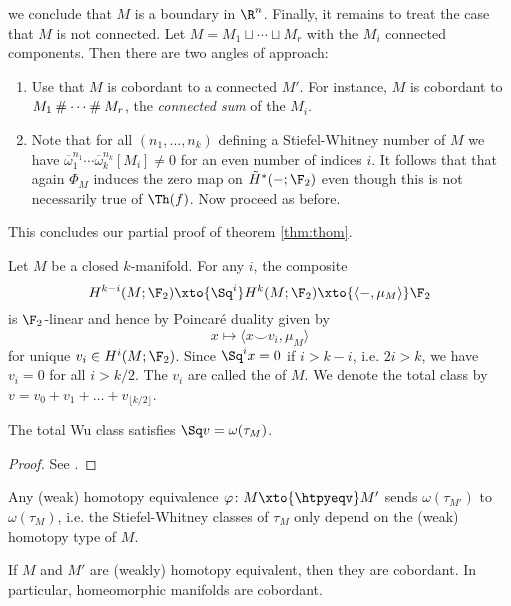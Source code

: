 we conclude that $M$ is a boundary in $\R^n$.
Finally, it remains to treat the case that $M$ is not connected.
Let $M = M_1 \sqcup \cdots \sqcup M_r$ with the $M_i$ connected components.
Then there are two angles of approach:
\begin{enumerate}
	\item Use that $M$ is cobordant to a connected $M'$.
		For instance, $M$ is cobordant to $M_1 \mathbin{\#} \cdots \mathbin{\#} M_r$, the \emph{connected sum} of the $M_i$.
	\item Note that for all $(n_1, \ldots, n_k)$ defining a Stiefel-Whitney number of $M$ we have $\overline{\omega}_1^{n_1} \cdots \overline{\omega}_k^{n_k}[M_i] \neq 0$ for an even number of indices $i$.
		It follows that that again $\Phi_M$ induces the zero map on $\tilde{H}^*({{-}}; \F_2)$ even though this is not necessarily true of $\Th(f)$.
		Now proceed as before.
\end{enumerate}
This concludes our partial proof of theorem \ref{thm:thom}.
\begin{remark}
	Let $M$ be a closed $k$-manifold.
	For any $i$, the composite
	\begin{equation*}
		H^{k - i}(M; \F_2) \xto{\Sq^i} H^k(M; \F_2) \xto{\langle {{-}}, \mu_M\rangle} \F_2
	\end{equation*}
	is $\F_2$-linear and hence by Poincaré duality given by
	\begin{equation*}
		x \mapsto \langle x \smile v_i, \mu_M \rangle
	\end{equation*}
	for unique $v_i \in H^i(M; \F_2)$.
	Since $\Sq^i x = 0$ if $i > k - i$, i.e. $2i > k$, we have $v_i = 0$ for all $i > k / 2$.
	The $v_i$ are called the  of $M$.
	We denote the total class by $v = v_0 + v_1 + \ldots + v_{\lfloor k / 2\rfloor}$.
\end{remark}
\begin{theorem}[Wu formula]
	The total Wu class satisfies $\Sq v = \omega(\tau_M)$.
\end{theorem}
\begin{proof}
	See \cite[Theorem 11.14]{milnor_characteristic_1974}.
\end{proof}
\begin{corollary}
	Any (weak) homotopy equivalence $\varphi\colon M \xto{\htpyeqv} M'$ sends $\omega(\tau_{M'})$ to $\omega(\tau_M)$, i.e. the Stiefel-Whitney classes of $\tau_M$ only depend on the (weak) homotopy type of $M$.
\end{corollary}
\begin{corollary}
	If $M$ and $M'$ are (weakly) homotopy equivalent, then they are cobordant.
	In particular, homeomorphic manifolds are cobordant.
\end{corollary}

